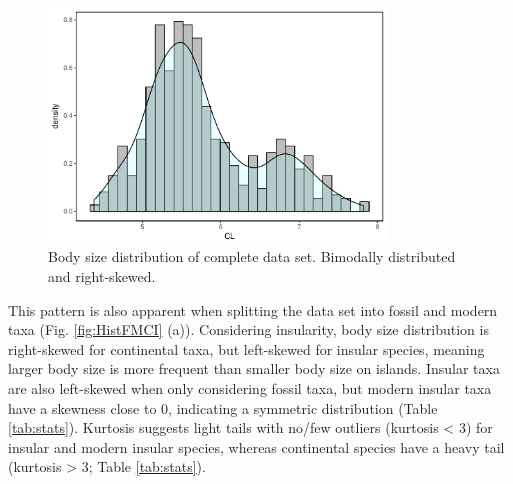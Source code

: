 \begin{figure}[htbp]
	\centering
	\includegraphics[width=0.8\textwidth]{MA_JJ_files/figure-latex/HistAll-1.pdf}
	\caption[CL distribution]{Body size distribution of complete data set. Bimodally distributed and right-skewed.}
	\label{fig:histAll}
\end{figure}

This pattern is also apparent when splitting the data set into fossil and modern taxa (Fig. \ref{fig:HistFMCI} (a)). Considering insularity, body size distribution is right-skewed for continental taxa, but left-skewed for insular species, meaning larger body size is more frequent than smaller body size on islands. Insular taxa are also left-skewed when only considering fossil taxa, but modern insular taxa have a skewness close to 0, indicating a symmetric distribution (Table \ref{tab:stats}).
Kurtosis suggests light tails with no/few outliers (kurtosis < 3) for insular and modern insular species, whereas continental species have a heavy tail (kurtosis > 3; Table \ref{tab:stats}).

